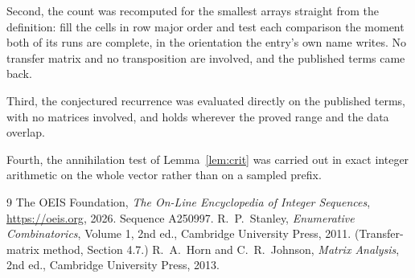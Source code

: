 \documentclass[11pt,a4paper]{article}
\theoremstyle{plain}
\theoremstyle{definition}
\begin{document}
Second, the count was recomputed for the smallest arrays straight from the definition: fill the
cells in row major order and test each comparison the moment both of its runs are complete,
in the orientation the entry's own name writes. No transfer matrix and no transposition are
involved, and the published terms came back.

Third, the conjectured recurrence was evaluated directly on the published terms, with no
matrices involved, and holds wherever the proved range and the data overlap.

Fourth, the annihilation test of Lemma~\ref{lem:crit} was carried out in exact integer
arithmetic on the whole vector rather than on a sampled prefix.

\begin{thebibliography}{9}
 The OEIS Foundation, \emph{The On-Line Encyclopedia of Integer
Sequences}, \url{https://oeis.org}, 2026. Sequence A250997.
 R.~P.~Stanley, \emph{Enumerative Combinatorics}, Volume 1, 2nd ed.,
Cambridge University Press, 2011. (Transfer-matrix method, Section 4.7.)
 R.~A.~Horn and C.~R.~Johnson, \emph{Matrix Analysis}, 2nd ed., Cambridge
University Press, 2013.
\end{thebibliography}
\end{document}
